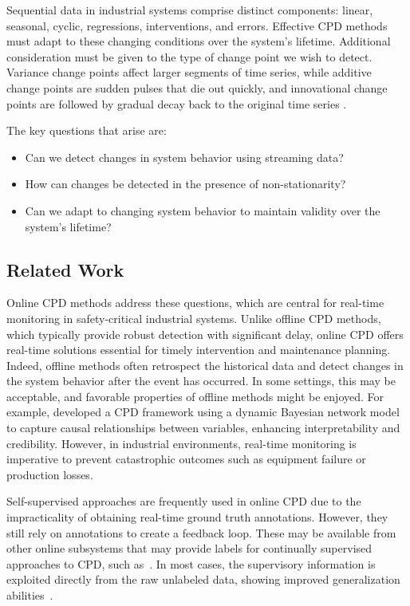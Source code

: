 Sequential data in industrial systems comprise distinct components: linear, seasonal, cyclic, regressions, interventions, and errors. Effective CPD methods must adapt to these changing conditions over the system's lifetime. Additional consideration must be given to the type of change point we wish to detect. Variance change points affect larger segments of time series, while additive change points are sudden pulses that die out quickly, and innovational change points are followed by gradual decay back to the original time series \citep{Srivastava2017}.

The key questions that arise are:
\begin{itemize}
    \item Can we detect changes in system behavior using streaming data?
    \item How can changes be detected in the presence of non-stationarity?
    \item Can we adapt to changing system behavior to maintain validity over the system's lifetime?
\end{itemize}

\subsection{Related Work}
Online CPD methods address these questions, which are central for real-time monitoring in safety-critical industrial systems. Unlike offline CPD methods, which typically provide robust detection with significant delay, online CPD offers real-time solutions essential for timely intervention and maintenance planning. Indeed, offline methods often retrospect the historical data and detect changes in the system behavior after the event has occurred. In some settings, this may be acceptable, and favorable properties of offline methods might be enjoyed. For example, \citet{Liu2022} developed a CPD framework using a dynamic Bayesian network model to capture causal relationships between variables, enhancing interpretability and credibility. However, in industrial environments, real-time monitoring is imperative to prevent catastrophic outcomes such as equipment failure or production losses.

Self-supervised approaches are frequently used in online CPD due to the impracticality of obtaining real-time ground truth annotations. However, they still rely on annotations to create a feedback loop. These may be available from other online subsystems that may provide labels for continually supervised approaches to CPD, such as~\cite {Korycki2021}. In most cases, the supervisory information is exploited directly from the raw unlabeled data, showing improved generalization abilities~\citep{Zhang2024}.  %


